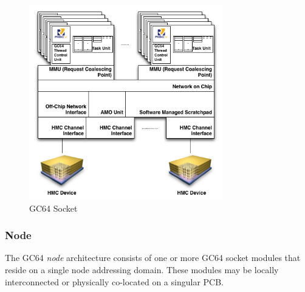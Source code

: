 \documentclass{article}
\begin{document}
\begin{figure}[h!]
\begin{center}
\includegraphics[width=0.75\textwidth]{gc64-socket.png}
\caption{GC64 Socket}
\end{center}
\label{figure:socket}
\end{figure}  

\newpage
\subsubsection{Node}

The GC64 \emph{node} architecture consists of one or more GC64 socket modules that reside on a single node addressing domain.  These modules may be locally interconnected or physically co-located on a singular PCB.  
\end{document}
